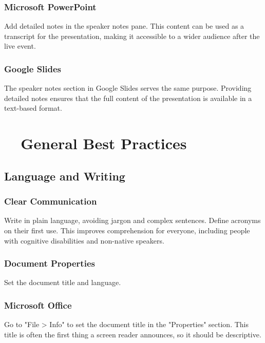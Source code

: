 \subsubsection{Microsoft PowerPoint}\label{ch15:sssec:ppt-speaker-notes}
Add detailed notes in the speaker notes pane. This content can be used as a transcript for the presentation, making it accessible to a wider audience after the live event.

\subsubsection{Google Slides}\label{ch15:sssec:slides-speaker-notes}
The speaker notes section in Google Slides serves the same purpose. Providing detailed notes ensures that the full content of the presentation is available in a text-based format.

\section{~~General Best Practices}\label{ch15:sec:general-best-practices}

\subsection{Language and Writing}\label{ch15:ssec:language-writing}

\subsubsection{Clear Communication}\label{ch15:sssec:clear-communication}
Write in plain language, avoiding jargon and complex sentences. Define acronyms on their first use. This improves comprehension for everyone, including people with cognitive disabilities and non-native speakers.

\subsubsection{Document Properties}\label{ch15:sssec:doc-properties}
Set the document title and language.

\subsubsection{Microsoft Office}\label{ch15:sssec:office-doc-properties}
Go to "File > Info" to set the document title in the "Properties" section. This title is often the first thing a screen reader announces, so it should be descriptive.

